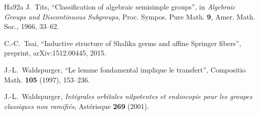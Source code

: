 \documentclass[12pt,letterpaper]{amsart}
\theoremstyle{plain}
\theoremstyle{definition}
\theoremstyle{remark}
\theoremstyle{definition}
\begin{document}
\begin{thebibliography}{Ha92a}
 J.~Tits, ``Classification of algebraic semisimple
groups'', in \textit{Algebraic Groups and Discontinuous Subgroups}, Proc.
Sympos. Pure Math. \textbf{9}, Amer. Math. Soc., 1966, 33--62.

 C.-C.~Tsai, ``Inductive structure of Shalika germs and
affine Springer fibers'', preprint, arXiv:1512.00445, 2015.

 J.-L.~Waldspurger, ``Le lemme fondamental implique le
transfert'', Compositio Math. \textbf{105} (1997), 153--236.

 J.-L.~Waldspurger, \textit{Int\'egrales orbitales
nilpotentes et endoscopie pour les groupes classiques non ramifi\'es},
Ast\'erisque \textbf{269} (2001).

\end{thebibliography}
\end{document}
